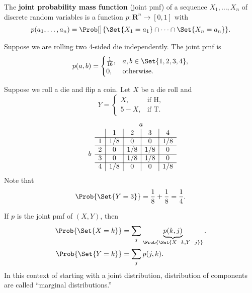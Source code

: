 \begin{Definition}{}{}
    The \textbf{joint probability mass function}
    (joint pmf) of a sequence $ X_1,\ldots,X_n $
    of discrete random variables is a function
    $ p\colon\mathbf{R}^n\to[0,1] $
    with
    \[ p(a_1,\ldots,a_n)=\Prob[\big]{\Set{X_1=a_1}\cap\cdots\cap \Set{X_n=a_n}}. \]
\end{Definition}
\begin{Example}{}{}
    Suppose we are rolling two 4-sided die independently. The joint pmf is
    \[ p(a,b)=\begin{cases}
            \frac{1}{16}, & a,b\in\Set{1,2,3,4}, \\
            \text{0},     & \text{otherwise}.
        \end{cases} \]
\end{Example}
\begin{Example}{}{}
    Suppose we roll a die and flip a coin. Let $ X $ be a die roll and
    \[ Y=\begin{cases}
            X,   & \text{if H}, \\
            5-X, & \text{if T}.
        \end{cases} \]
    \[ \begin{array}{cc|c|c|c|c}
            \multicolumn{2}{c}{} & \multicolumn{4}{c}{a}                         \\
                                 &                       & 1   & 2   & 3   & 4   \\
            \cline{2-6}
            \multirow{4}{*}{$b$} & 1                     & 1/8 & 0   & 0   & 1/8 \\
            \cline{2-6}
                                 & 2                     & 0   & 1/8 & 1/8 & 0   \\
            \cline{2-6}
                                 & 3                     & 0   & 1/8 & 1/8 & 0   \\
            \cline{2-6}
                                 & 4                     & 1/8 & 0   & 0   & 1/8
        \end{array} \]
    Note that
    \[ \Prob{\Set{Y=3}}=\frac{1}{8}+\frac{1}{8}=\frac{1}{4}. \]
\end{Example}
\begin{Remark}{}{}
    If $ p $ is the joint pmf of $ (X,Y) $, then
    \begin{align*}
        \Prob{\Set{X=k}} & =\sum_{j}\underbrace{p(k,j)}_{\Prob{\Set{X=k,Y=j}}}. \\
        \Prob{\Set{Y=k}} & =\sum_{j}p(j,k).
    \end{align*}
    In this context of starting with a joint distribution,
    distribution of components are called ``marginal distributions.''
\end{Remark}
